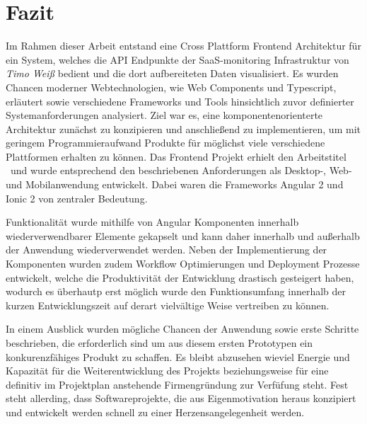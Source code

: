 \chapter{Fazit}

Im Rahmen dieser Arbeit entstand eine Cross Plattform Frontend Architektur für ein System,
welches die API Endpunkte der SaaS-monitoring Infrastruktur von \emph{Timo Weiß} bedient und die dort aufbereiteten Daten visualisiert.
Es wurden Chancen moderner Webtechnologien, wie Web Components und Typescript, erläutert
sowie verschiedene Frameworks und Tools hinsichtlich zuvor definierter Systemanforderungen analysiert.
Ziel war es, eine komponentenorienterte Architektur zunächst zu konzipieren und anschließend zu implementieren, um
mit geringem Programmieraufwand Produkte für möglichst viele verschiedene Plattformen erhalten zu können.
Das Frontend Projekt erhielt den Arbeitstitel \projectname{} und wurde entsprechend den beschriebenen Anforderungen
als Desktop-, Web- und Mobilanwendung entwickelt. Dabei waren die Frameworks Angular 2 und Ionic 2 von zentraler Bedeutung.

Funktionalität wurde mithilfe von Angular Komponenten innerhalb wiederverwendbarer
Elemente gekapselt und kann daher innerhalb und außerhalb der Anwendung wiederverwendet werden.
Neben der Implementierung der Komponenten wurden zudem Workflow Optimierungen und Deployment Prozesse entwickelt,
welche die Produktivität der Entwicklung drastisch gesteigert haben, wodurch es überhautp erst möglich wurde den Funktionsumfang
innerhalb der kurzen Entwicklungszeit auf derart vielvältige Weise vertreiben zu können.

In einem Ausblick wurden mögliche Chancen der Anwendung sowie erste Schritte beschrieben, die erforderlich sind um aus diesem ersten
Prototypen ein konkurenzfähiges Produkt zu schaffen.
Es bleibt abzusehen wieviel Energie und Kapazität für die Weiterentwicklung des Projekts beziehungsweise für eine definitiv im Projektplan anstehende Firmengründung zur Verfüfung steht.
Fest steht allerding, dass Softwareprojekte, die aus Eigenmotivation heraus konzipiert und entwickelt werden schnell zu einer Herzensangelegenheit werden.
